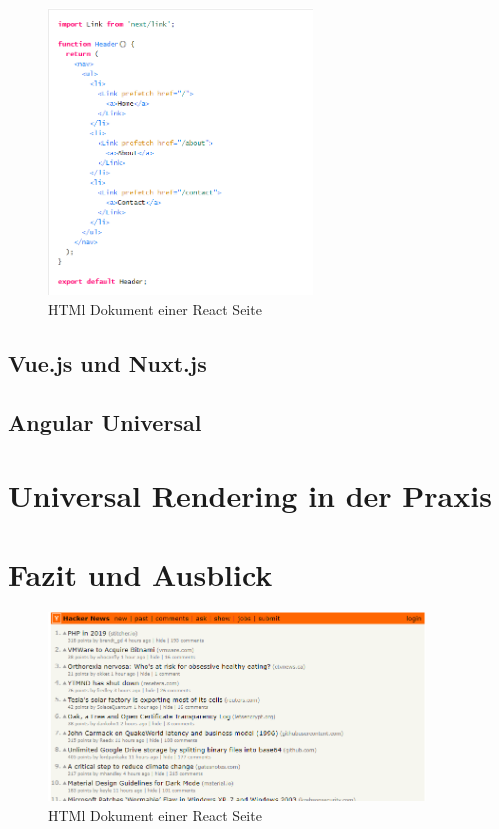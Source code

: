 \documentclass[runningheads]{llncs}
\begin{document}
\begin{figure}
  \centering
  \includegraphics[width=7cm]{images/prefetchnext}
  \caption{HTMl Dokument einer React Seite}
\end{figure}


\subsection{Vue.js und Nuxt.js}
\label{subsec:Vue.js und Nuxt.js}

\subsection{Angular Universal}
\label{subsec:Angular Universal}

\newpage

\section{Universal Rendering in der Praxis}
\label{sec:Universal Rendering in der Praxis}

\newpage

\section{Fazit und Ausblick}
\label{sec:Fazit}

\begin{figure}
  \centering
  \includegraphics[width=10cm]{images/HackerNews}
  \caption{HTMl Dokument einer React Seite}
\end{figure}
\end{document}
